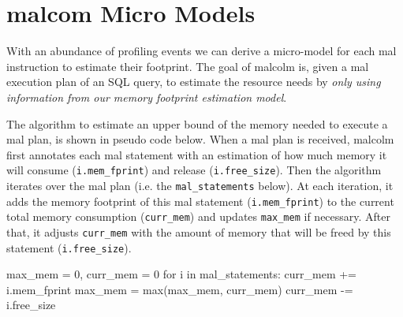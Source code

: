 \documentclass[conference]{IEEEtran}
\begin{document}

\section{{\sc malcom} Micro Models}
\label{sec:malcolm} 
With an abundance of profiling events we can derive a micro-model for each {\sc mal} instruction to estimate their footprint.
The goal of {\sc malcolm} is, given a {\sc mal} execution plan of an SQL query, to estimate the resource needs by \textit{only using information from our memory footprint estimation model}.

The algorithm to estimate an upper bound of the memory needed to execute a {\sc mal} plan, is shown in pseudo code below.
When a {\sc mal} plan is received, {\sc malcolm} first annotates each {\sc mal} statement with an estimation of how much memory it will consume (\texttt{\small i.mem\_fprint}) and release (\texttt{\small i.free\_size}).
Then the algorithm iterates over the {\sc mal} plan (i.e. the \texttt{\small mal\_statements} below).
At each iteration, it adds the memory footprint of this {\sc mal} statement (\texttt{\small i.mem\_fprint}) to the current total memory consumption (\texttt{\small curr\_mem}) and updates \texttt{\small max\_mem} if necessary.
After that, it adjusts \texttt{\small curr\_mem} with the amount of memory that will be freed by this statement (\texttt{\small i.free\_size}). 
\begin{verb}
max_mem  = 0, curr_mem = 0 
for i in mal_statements:
  curr_mem += i.mem_fprint
  max_mem = max(max_mem, curr_mem)
  curr_mem -= i.free_size
\end{verb}
\end{document}
